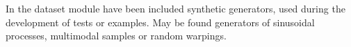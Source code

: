 In the dataset module have been included synthetic generators, used during the
development of tests or examples. May be found generators of sinusoidal
processes, multimodal samples or random warpings.
